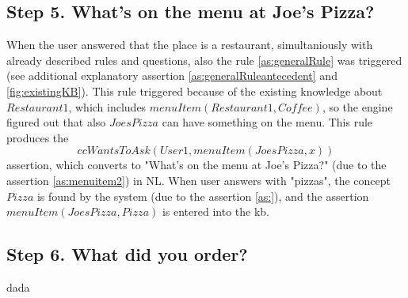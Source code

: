 \subsection{Step 5. What's on the menu at Joe's Pizza?}
\label{section:step5}
When the user answered that the place is a restaurant, simultaniously with
already described rules and questions, also the rule \ref{as:generalRule} was
triggered (see additional explanatory assertion \ref{as:generalRuleantecedent}
and \ref{fig:existingKB}). This rule triggered  
because of the existing knowledge about $Restaurant1$, which includes 
$menuItem(Restaurant1,Coffee)$, so the engine figured out that also $JoesPizza$
can have something on the menu. This rule produces the
\begin{equation*}
	ccWantsToAsk(User1,menuItem(JoesPizza,x))
\end{equation*}
assertion, which converts to "What's on the menu at Joe's 
Pizza?" (due to the assertion \ref{as:menuitem2}) in NL. When user answers with
"pizzas", the concept $Pizza$ is found by the system (due to the assertion
\ref{as:}), and the assertion $menuItem(JoesPizza,Pizza)$ is entered into the 
kb. 

\subsection{Step 6. What did you order?}
\label{section:step6}
dada 


